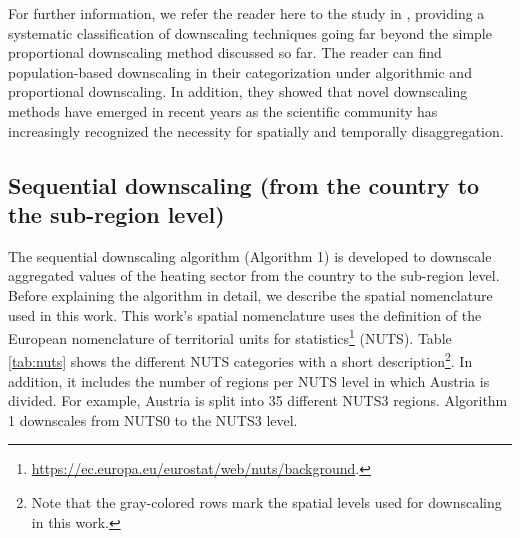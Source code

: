 For further information, we refer the reader here to the study in \cite{van2010downscaling}, providing a systematic classification of downscaling techniques going far beyond the simple proportional downscaling method discussed so far. The reader can find population-based downscaling in their categorization under algorithmic and proportional downscaling. In addition, they showed that novel downscaling methods have emerged in recent years as the scientific community has increasingly recognized the necessity for spatially and temporally disaggregation.

\subsection{Sequential downscaling (from the country to the sub-region level)}\label{alg1}
The sequential downscaling algorithm (Algorithm 1) is developed to downscale aggregated values of the heating sector from the country to the sub-region level. Before explaining the algorithm in detail, we describe the spatial nomenclature used in this work. This work's spatial nomenclature uses the definition of the European nomenclature of territorial units for statistics\footnote{\url{https://ec.europa.eu/eurostat/web/nuts/background}.} (NUTS). Table \ref{tab:nuts} shows the different NUTS categories with a short description\footnote{Note that the gray-colored rows mark the spatial levels used for downscaling in this work.}. In addition, it includes the number of regions per NUTS level in which Austria is divided. For example, Austria is split into \SI{35}{} different NUTS3 regions. Algorithm 1 downscales from NUTS0 to the NUTS3 level.\vspace{0.3cm}

